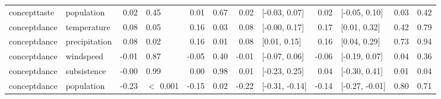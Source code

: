 \begin{table}[ht]
\begin{tabular}{llrlrlrlrlrr}
  concepttaste & population & 0.02 & 0.45 & 0.01 & 0.67 & 0.02 & [-0.03, 0.07] & 0.02 & [-0.05, 0.10] & 0.03 & 0.42 \\ 
  conceptdance & temperature & 0.08 & 0.05 & 0.16 & 0.03 & 0.08 & [-0.00, 0.17] & 0.17 & [0.01, 0.32] & 0.42 & 0.79 \\ 
  conceptdance & precipitation & 0.08 & 0.02 & 0.16 & 0.01 & 0.08 & [0.01, 0.15] & 0.16 & [0.04, 0.29] & 0.73 & 0.94 \\ 
  conceptdance & windspeed & -0.01 & 0.87 & -0.05 & 0.40 & -0.01 & [-0.07, 0.06] & -0.06 & [-0.19, 0.07] & 0.04 & 0.36 \\ 
  conceptdance & subsistence & -0.00 & 0.99 & 0.00 & 0.98 & 0.01 & [-0.23, 0.25] & 0.04 & [-0.30, 0.41] & 0.01 & 0.04 \\ 
  conceptdance & population & -0.23 & $<$ 0.001 & -0.15 & 0.02 & -0.22 & [-0.31, -0.14] & -0.14 & [-0.27, -0.01] & 0.80 & 0.71 \\ 
   \hline
\end{tabular}
\end{table}
